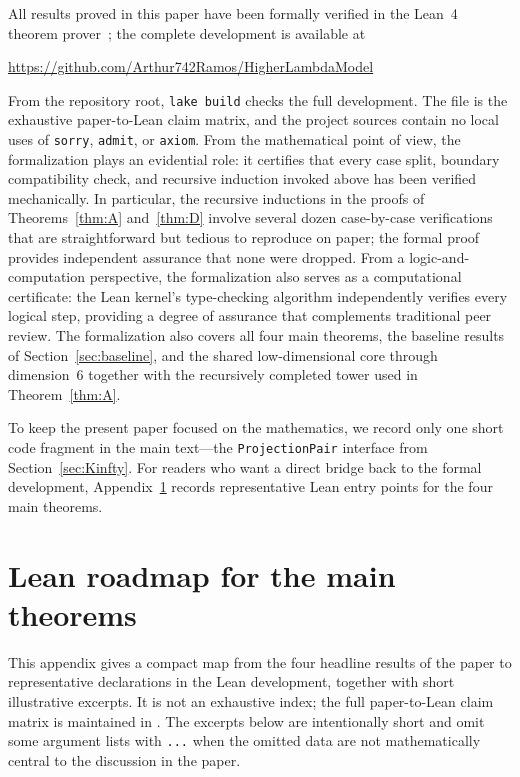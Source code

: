 \documentclass[webpdf,traditional,large,numbered]{oup-authoring-template}
\newcommand{\appendix}{%
    \setcounter{section}{0}%
    \setcounter{subsection}{0}%
    \gdef\thesection{\Alph{section}}%
    \gdef\theHsection{appendix.\Alph{section}}%
    \gdef\theHsubsection{appendix.\Alph{section}.\arabic{subsection}}}
\theoremstyle{thmstyleone}%
\theoremstyle{thmstyletwo}%
\theoremstyle{thmstylethree}%
\begin{document}
All results proved in this paper have been formally verified in the Lean~4
theorem prover~\cite{Lean4}; the complete development is available at
\begin{center}
  \url{https://github.com/Arthur742Ramos/HigherLambdaModel}
\end{center}
\noindent From the repository root, \texttt{lake build} checks the full
development.  The file  is the exhaustive
paper-to-Lean claim matrix, and the project sources contain no local uses of
\texttt{sorry}, \texttt{admit}, or \texttt{axiom}.
From the mathematical point of view, the formalization plays an evidential role:
it certifies that every case split, boundary compatibility check, and recursive
induction invoked above has been verified mechanically.  In particular, the
recursive inductions in the proofs of Theorems~\ref{thm:A} and~\ref{thm:D}
involve several dozen case-by-case verifications that are straightforward but
tedious to reproduce on paper; the formal proof provides independent assurance
that none were dropped.
From a logic-and-computation perspective, the formalization also serves as a
computational certificate: the Lean kernel's type-checking algorithm
independently verifies every logical step, providing a degree of assurance that
complements traditional peer review.
The formalization also covers all four main theorems,
the baseline results of Section~\ref{sec:baseline}, and the shared
low-dimensional core through dimension~6 together with the recursively
completed tower used in Theorem~\ref{thm:A}.

To keep the present paper focused on the mathematics, we record only one short
code fragment in the main text---the \texttt{ProjectionPair} interface from
Section~\ref{sec:Kinfty}.  For readers who want a direct bridge back to the
formal development, Appendix~\ref{app:lean-map} records representative Lean
entry points for the four main theorems.


\appendix

\section{Lean roadmap for the main theorems}\label{app:lean-map}

This appendix gives a compact map from the four headline results of the paper
to representative declarations in the Lean development, together with short
illustrative excerpts.  It is not an exhaustive index; the full paper-to-Lean
claim matrix is maintained in .  The excerpts below
are intentionally short and omit some argument lists with \texttt{...} when the
omitted data are not mathematically central to the discussion in the paper.
\end{document}
